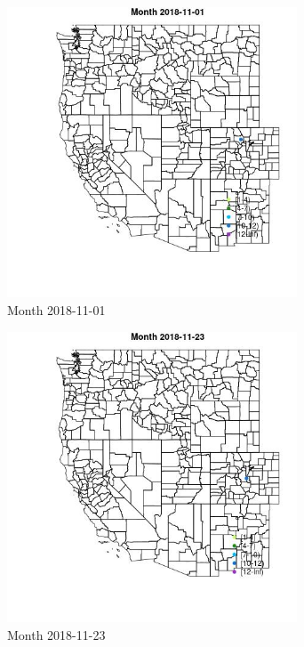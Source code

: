 \begin{figure} 
\centering  
\includegraphics[width=0.77\textwidth]{Code_Outputs/Report_ML_input_PM25_Step4_part_e_de_duplicated_aves_MapObsMonth2018-11-01.jpg} 
\caption{\label{fig:Report_ML_input_PM25_Step4_part_e_de_duplicated_avesMapObsMonth2018-11-01}Month 2018-11-01} 
\end{figure} 
 

\begin{figure} 
\centering  
\includegraphics[width=0.77\textwidth]{Code_Outputs/Report_ML_input_PM25_Step4_part_e_de_duplicated_aves_MapObsMonth2018-11-23.jpg} 
\caption{\label{fig:Report_ML_input_PM25_Step4_part_e_de_duplicated_avesMapObsMonth2018-11-23}Month 2018-11-23} 
\end{figure} 
 

